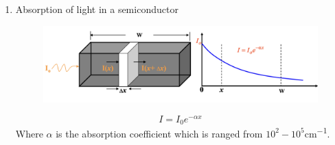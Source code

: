 \begin{enumerate}
\begin{enumerate}
    \end{enumerate}
    \item Absorption of light in a semiconductor \\
    \begin{figure}[h]
        \centering
        \includegraphics[width=1\linewidth]{image/absorption.png}
    \end{figure}
    \begin{equation}
        I = I_0e^{-\alpha x}
    \end{equation}
    Where $\alpha$ is the absorption coefficient which is ranged from $10^2 - 10^5$\unit{cm^{-1}}.
\end{enumerate}


\newpage